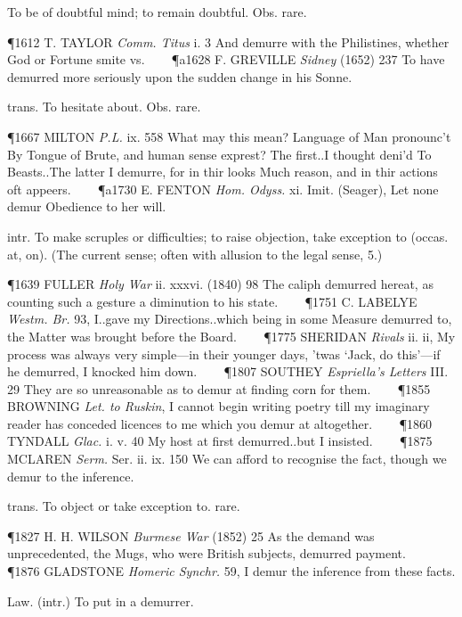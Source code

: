 \begin{description}[wide, labelwidth=!, labelindent=0pt]
\begin{myenumerate}
 To be of doubtful mind; to remain doubtful. Obs. rare.

\P 1612 T. TAYLOR  \textit{Comm. Titus} i. 3 And demurre with the Philistines, whether God or Fortune smite vs.    
\P a1628 F. GREVILLE  \textit{Sidney} (1652) 237 To have demurred more seriously upon the sudden change in his Sonne.

 trans. To hesitate about. Obs. rare.

\P 1667 MILTON  \textit{P.L.} ix. 558 What may this mean? Language of Man pronounc't By Tongue of Brute, and human sense exprest? The first..I thought deni'd To Beasts..The latter I demurre, for in thir looks Much reason, and in thir actions oft appeers.    
\P a1730 E. FENTON  \textit{Hom. Odyss.} xi. Imit. (Seager), Let none demur Obedience to her will.

 intr. To make scruples or difficulties; to raise objection, take exception to (occas. at, on). (The current sense; often with allusion to the legal sense, 5.)

\P 1639 FULLER  \textit{Holy War} ii. xxxvi. (1840) 98 The caliph demurred hereat, as counting such a gesture a diminution to his state.    
\P 1751 C. LABELYE  \textit{Westm. Br.} 93, I..gave my Directions..which being in some Measure demurred to, the Matter was brought before the Board.    
\P 1775 SHERIDAN  \textit{Rivals} ii. ii, My process was always very simple—in their younger days, 'twas ‘Jack, do this’—if he demurred, I knocked him down.    
\P 1807 SOUTHEY  \textit{Espriella's Letters} III. 29 They are so unreasonable as to demur at finding corn for them.    
\P 1855 BROWNING  \textit{Let. to Ruskin}, I cannot begin writing poetry till my imaginary reader has conceded licences to me which you demur at altogether.    
\P 1860 TYNDALL  \textit{Glac.} i. v. 40 My host at first demurred..but I insisted.    
\P 1875 MCLAREN  \textit{Serm.} Ser. ii. ix. 150 We can afford to recognise the fact, though we demur to the inference.

 trans. To object or take exception to. rare.

\P 1827 H. H. WILSON  \textit{Burmese War} (1852) 25 As the demand was unprecedented, the Mugs, who were British subjects, demurred payment.    
\P 1876 GLADSTONE  \textit{Homeric Synchr.} 59, I demur the inference from these facts.

 Law. (intr.) To put in a demurrer.


\end{myenumerate}
\end{description}
